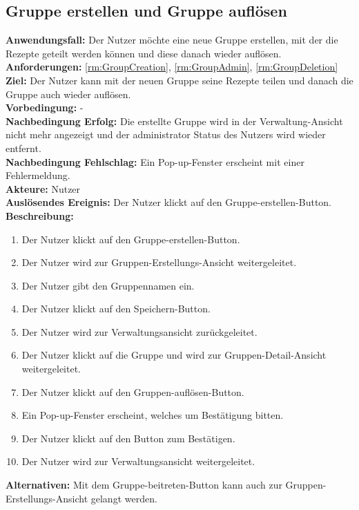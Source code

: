 \documentclass[parskip=full]{scrartcl}
\begin{document}
\subsection{Gruppe erstellen und Gruppe auflösen}
\textbf{Anwendungsfall:} Der Nutzer möchte eine neue Gruppe erstellen, mit der die Rezepte geteilt werden können und diese danach wieder auflösen.\\
\textbf{Anforderungen:} \ref{rm:GroupCreation}, \ref{rm:GroupAdmin}, \ref{rm:GroupDeletion} \\
\textbf{Ziel:} Der Nutzer kann mit der neuen Gruppe seine Rezepte teilen und danach die Gruppe auch wieder auflösen.\\
\textbf{Vorbedingung:} -\\
\textbf{Nachbedingung Erfolg:} Die erstellte Gruppe wird in der Verwaltung-Ansicht nicht mehr angezeigt und der \Gls{administrator} Status des Nutzers wird wieder entfernt.\\
\textbf{Nachbedingung Fehlschlag:} Ein Pop-up-Fenster erscheint mit einer Fehlermeldung.\\
\textbf{Akteure:} Nutzer\\
\textbf{Auslösendes Ereignis:} Der Nutzer klickt auf den Gruppe-erstellen-Button.\\
\textbf{Beschreibung:}
\begin{enumerate}
    \item Der Nutzer klickt auf den Gruppe-erstellen-Button.
    \item Der Nutzer wird zur Gruppen-Erstellungs-Ansicht weitergeleitet.
    \item Der Nutzer gibt den Gruppennamen ein.
    \item Der Nutzer klickt auf den Speichern-Button.
    \item Der Nutzer wird zur Verwaltungsansicht zurückgeleitet.
    \item Der Nutzer klickt auf die Gruppe und wird zur Gruppen-Detail-Ansicht weitergeleitet.
    \item Der Nutzer klickt auf den Gruppen-auflösen-Button.
    \item Ein Pop-up-Fenster erscheint, welches um Bestätigung bitten.
    \item Der Nutzer klickt auf den Button zum Bestätigen.
    \item Der Nutzer wird zur Verwaltungsansicht weitergeleitet.
\end{enumerate}
\textbf{Alternativen:} Mit dem Gruppe-beitreten-Button kann auch zur Gruppen-Erstellungs-Ansicht gelangt werden.
\newpage
\end{document}

